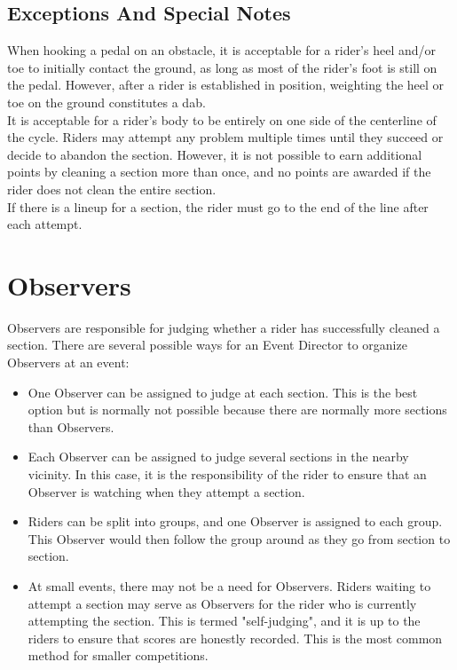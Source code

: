 \subsection{Exceptions And Special Notes}
When hooking a pedal on an obstacle, it is acceptable for a rider's heel and/or toe to initially contact the ground, as long
as most of the rider's foot is still on the pedal. However, after a rider is established in position, weighting the heel or toe
on the ground constitutes a dab.\\
It is acceptable for a rider’s body to be entirely on one side of the centerline of the cycle.
Riders may attempt any problem multiple times until they succeed or decide to abandon the section. However, it is not
possible to earn additional points by cleaning a section more than once, and no points are awarded if the rider does not
clean the entire section.\\
If there is a lineup for a section, the rider must go to the end of the line after each attempt.

\section{Observers}
Observers are responsible for judging whether a rider has successfully cleaned a section. There are several possible ways
for an Event Director to organize Observers at an event:
\begin{itemize}
\item One Observer can be assigned to judge at each section. This is the best option but is normally not possible because
there are normally more sections than Observers.
\item Each Observer can be assigned to judge several sections in the nearby vicinity. In this case, it is the responsibility of
the rider to ensure that an Observer is watching when they attempt a section.
\item Riders can be split into groups, and one Observer is assigned to each group. This Observer would then follow the
group around as they go from section to section.
\item At small events, there may not be a need for Observers. Riders waiting to attempt a section may serve as Observers
for the rider who is currently attempting the section. This is termed "self-judging", and it is up to the riders to ensure
that scores are honestly recorded. This is the most common method for smaller competitions.
\end{itemize}

